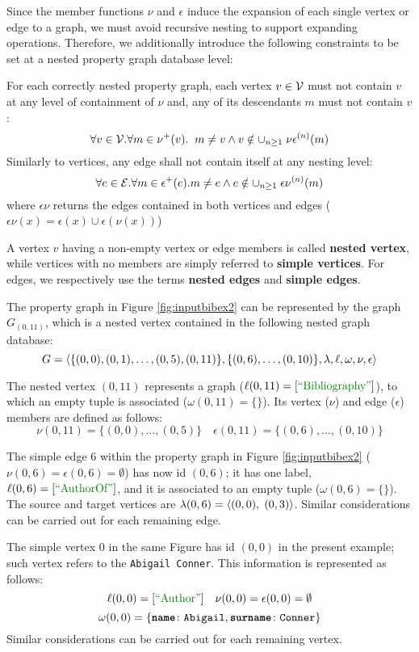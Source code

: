 Since the member functions $\nu$ and $\epsilon$ induce the expansion of each single vertex or edge to a graph, we must avoid recursive nesting to support expanding operations.
Therefore, we additionally introduce the following constraints to be set at a nested property graph database level:

\begin{axiom}
	For each correctly nested property graph, each vertex $v\in \mathcal{V}$ must not contain $v$ at any level of containment of $\nu$ and, any of its descendants $m$ must not contain $v$:
	\[\forall v\in \mathcal{V}. \forall m\in \nu^+(v).\;\; m\neq v\wedge v\notin \cup_{n\geq 1}\;{\nu\epsilon}^{(n)}(m)\]
	Similarly to vertices, any edge shall not contain itself at any nesting level:
	\[\forall e\in \mathcal{E}. \forall m\in \epsilon^+(e). m\neq e\wedge e\notin \cup_{n\geq 1}\;{\epsilon\nu}^{(n)}(m)\]
	where ${\epsilon\nu}$ returns the edges contained in both vertices and edges ($\epsilon\nu(x)=\epsilon(x)\cup \epsilon(\nu(x))$)
\end{axiom}

A vertex $v$ having a non-empty vertex or edge members is called \textbf{nested vertex}, while vertices with no members are simply referred to \textbf{simple vertices}. For edges, we respectively use the terms \textbf{nested edges} and \textbf{simple edges}. 

\begin{ex}[label=exImpl]
The property graph in Figure \ref{fig:inputbibex2} can be represented by the graph $G_{(0,11)}$, which is a nested vertex contained in the following nested graph database:
\[G=\Braket{\{(0,0),(0,1),\dots,(0,5),(0,11)\}, \{(0,6),\dots,(0,10)\},\lambda,\ell,\omega,\nu,\epsilon}\]

The nested vertex $(0,11)$  represents a  graph ($\ell(0,11)=[\mstr{Bibliography}]$), to which an empty tuple is associated ($\omega(0,11)=\{\}$). Its vertex ($\nu$) and edge ($\epsilon$) members are defined as follows:
\[\nu(0,11)=\{(0,0),\dots,(0,5)\}\quad\epsilon(0,11)=\{(0,6),\dots,(0,10)\}\]

The simple edge $6$ within the property graph in Figure \ref{fig:inputbibex2} ($\nu(0,6)=\epsilon(0,6)=\emptyset$) has now id $(0,6)$; it has one label, $\ell(0,6)=[\mstr{AuthorOf}]$, and it is associated to an empty tuple ($\omega(0,6)=\{\}$).
The source and target vertices are 
$\lambda(0,6)=\Braket{(0,0),\;(0,3)}$. Similar considerations can be carried out for each  remaining edge.

The simple vertex $0$ in the same Figure has id $(0,0)$ in the present example; such vertex refers to the  \texttt{Abigail Conner}. This information is represented as follows:
\[\ell(0,0)=[\mstr{Author}]\quad\nu(0,0)=\epsilon(0,0)=\emptyset\] \[\omega(0,0)=\{\texttt{\textbf{name}}\colon\texttt{Abigail},\texttt{\textbf{surname}}\colon\texttt{Conner}\}\]
Similar considerations can be carried out for each remaining vertex.

\end{ex}
